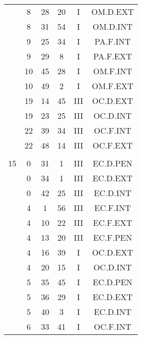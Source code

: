 \documentclass[12pt, a4paper]{article}
\begin{document}
\begin{multicols}{3}
{\begin{tabular}{c c c c c c}
	 	 	 	 & 8 & 28 & 20 & I & OM.D.EXT\\%
	 	 	 	 & 8 & 31 & 54 & I & OM.D.INT\\%
	 	 	 	 & 9 & 25 & 34 & I & PA.F.INT\\%
	 	 	 	 & 9 & 29 & 8 & I & PA.F.EXT\\%
	 	 	 	 & 10 & 45 & 28 & I & OM.F.INT\\%
	 	 	 	 & 10 & 49 & 2 & I & OM.F.EXT\\%
	 	 	 	 & 19 & 14 & 45 & III & OC.D.EXT\\%
	 	 	 	 & 19 & 23 & 25 & III & OC.D.INT\\%
	 	 	 	 & 22 & 39 & 34 & III & OC.F.INT\\%
	 	 	 	 & 22 & 48 & 14 & III & OC.F.EXT\\%
	 	 	 	 & & & & & \\%
	 	 	 	15 & 0 & 31 & 1 & III & EC.D.PEN\\%
	 	 	 	 & 0 & 34 & 1 & III & EC.D.EXT\\%
	 	 	 	 & 0 & 42 & 25 & III & EC.D.INT\\%
	 	 	 	 & 4 & 1 & 56 & III & EC.F.INT\\%
	 	 	 	 & 4 & 10 & 22 & III & EC.F.EXT\\%
	 	 	 	 & 4 & 13 & 20 & III & EC.F.PEN\\%
	 	 	 	 & 4 & 16 & 39 & I & OC.D.EXT\\%
	 	 	 	 & 4 & 20 & 15 & I & OC.D.INT\\%
	 	 	 	 & 5 & 35 & 45 & I & EC.D.PEN\\%
	 	 	 	 & 5 & 36 & 29 & I & EC.D.EXT\\%
	 	 	 	 & 5 & 40 & 3 & I & EC.D.INT\\%
	 	 	 	 & 6 & 33 & 41 & I & OC.F.INT\\%

\end{tabular}}
\end{multicols}
\end{document}
